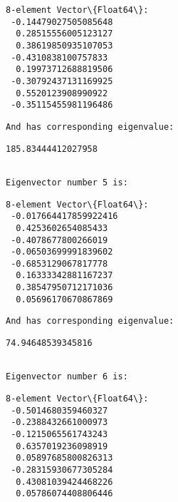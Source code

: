 \documentclass[11pt]{article}
\begin{document}
    
    \begin{Verbatim}[commandchars=\\\{\}]
8-element Vector\{Float64\}:
 -0.14479027505085648
  0.28515556005123127
  0.38619850935107053
 -0.4310838100757833
  0.19973712688819506
 -0.30792437131169925
  0.5520123908990922
 -0.35115455981196486
    \end{Verbatim}

    
    \begin{Verbatim}[commandchars=\\\{\}]
And has corresponding eigenvalue:
    \end{Verbatim}

    
    \begin{Verbatim}[commandchars=\\\{\}]
185.83444412027958
    \end{Verbatim}

    
    \begin{Verbatim}[commandchars=\\\{\}]

Eigenvector number 5 is:
    \end{Verbatim}

    
    \begin{Verbatim}[commandchars=\\\{\}]
8-element Vector\{Float64\}:
 -0.017664417859922416
  0.4253602654085433
 -0.4078677800266019
 -0.06503699991839602
 -0.6853129067817778
  0.16333342881167237
  0.38547950712171036
  0.05696170670867869
    \end{Verbatim}

    
    \begin{Verbatim}[commandchars=\\\{\}]
And has corresponding eigenvalue:
    \end{Verbatim}

    
    \begin{Verbatim}[commandchars=\\\{\}]
74.94648539345816
    \end{Verbatim}

    
    \begin{Verbatim}[commandchars=\\\{\}]

Eigenvector number 6 is:
    \end{Verbatim}

    
    \begin{Verbatim}[commandchars=\\\{\}]
8-element Vector\{Float64\}:
 -0.5014680359460327
 -0.2388432661000973
 -0.1215065561743243
  0.6357019236098919
  0.05897685800826313
 -0.28315930677305284
  0.43081039424468226
  0.05786074408806446
    \end{Verbatim}
\end{document}
